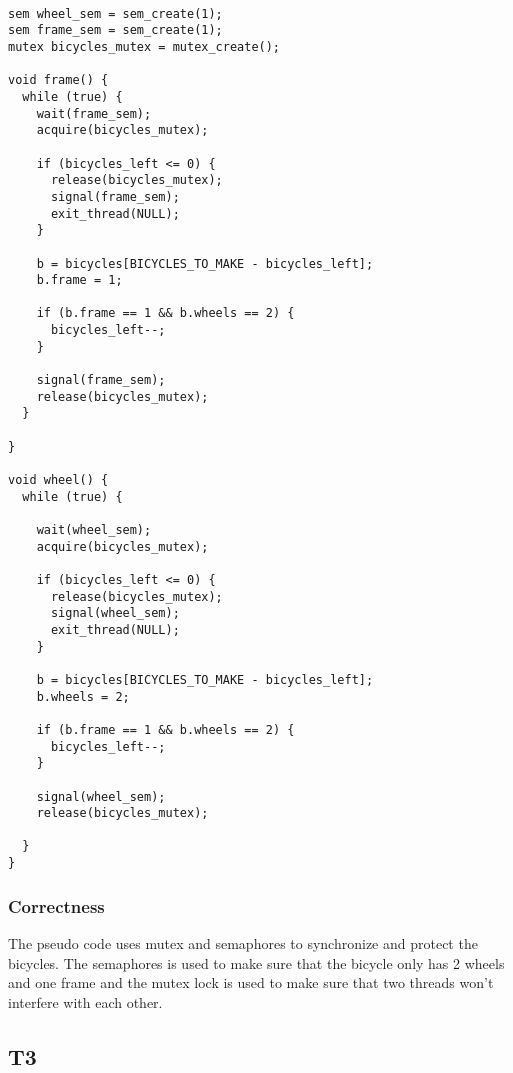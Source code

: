 \documentclass[12pt]{article}
\begin{document}
\begin{lstlisting}[label=bicycle-code,caption=Bicycle Factory]

sem wheel_sem = sem_create(1);
sem frame_sem = sem_create(1);
mutex bicycles_mutex = mutex_create();

void frame() {
  while (true) {
    wait(frame_sem);
    acquire(bicycles_mutex);

    if (bicycles_left <= 0) {
      release(bicycles_mutex);
      signal(frame_sem);
      exit_thread(NULL);
    }

    b = bicycles[BICYCLES_TO_MAKE - bicycles_left];
    b.frame = 1;

    if (b.frame == 1 && b.wheels == 2) {
      bicycles_left--;
    }

    signal(frame_sem);
    release(bicycles_mutex);
  }

}

void wheel() {
  while (true) {

    wait(wheel_sem);
    acquire(bicycles_mutex);

    if (bicycles_left <= 0) {
      release(bicycles_mutex);
      signal(wheel_sem);
      exit_thread(NULL);
    }

    b = bicycles[BICYCLES_TO_MAKE - bicycles_left];
    b.wheels = 2;

    if (b.frame == 1 && b.wheels == 2) {
      bicycles_left--;
    }

    signal(wheel_sem);
    release(bicycles_mutex);
    
  }
}

\end{lstlisting}


\vspace{2 mm}

\subsubsection{Correctness}

The pseudo code uses mutex and semaphores to synchronize and protect the bicycles. The semaphores is used to make sure that the bicycle only has 2 wheels and one frame and the mutex lock is used to make sure that two threads won't interfere with each other.


\subsection{T3}
\end{document}
